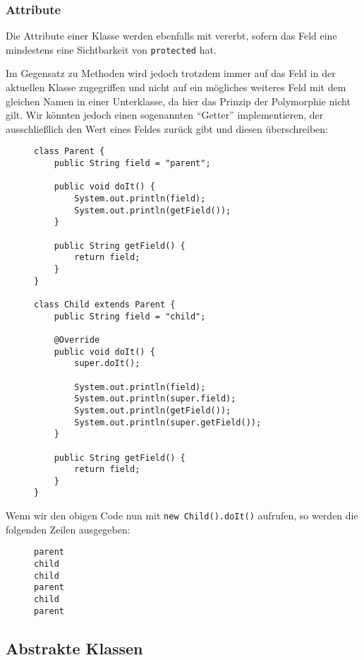 	\subsubsection{Attribute}
		Die Attribute einer Klasse werden ebenfalls mit vererbt, sofern das Feld eine mindestens eine Sichtbarkeit von \lstinline|protected| hat.
		
		Im Gegensatz zu Methoden wird jedoch trotzdem immer auf das Feld in der aktuellen Klasse zugegriffen und nicht auf ein mögliches weiteres Feld mit dem gleichen Namen in einer Unterklasse, da hier das Prinzip der Polymorphie nicht gilt. Wir könnten jedoch einen sogenannten \enquote{Getter} implementieren, der ausschließlich den Wert eines Feldes zurück gibt und diesen überschreiben:
		\begin{figure}[H]
			\centering
			\begin{lstlisting}
class Parent {
	public String field = "parent";

	public void doIt() {
		System.out.println(field);
		System.out.println(getField());
	}

	public String getField() {
		return field;
	}
}

class Child extends Parent {
	public String field = "child";

	@Override
	public void doIt() {
		super.doIt();

		System.out.println(field);
		System.out.println(super.field);
		System.out.println(getField());
		System.out.println(super.getField());
	}

	public String getField() {
		return field;
	}
}
\end{lstlisting}
		\end{figure}
		Wenn wir den obigen Code nun mit \lstinline|new Child().doIt()| aufrufen, so werden die folgenden Zeilen ausgegeben:
		\begin{figure}[H]
			\centering
			\begin{verbatim}
parent
child
child
parent
child
parent
\end{verbatim}
		\end{figure}

\subsection{Abstrakte Klassen}
	
